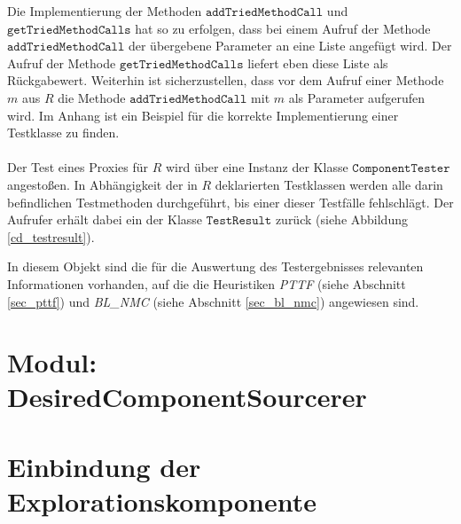 \noindent
Die Implementierung der Methoden $\texttt{addTriedMethodCall}$ und $\texttt{getTriedMethodCalls}$ hat so zu erfolgen, dass bei einem Aufruf der Methode $\texttt{addTriedMethodCall}$ der übergebene Parameter an eine Liste angefügt wird. Der Aufruf der Methode $\texttt{getTriedMethodCalls}$ liefert eben diese Liste als Rückgabewert. Weiterhin ist sicherzustellen, dass vor dem Aufruf einer Methode $m$ aus $R$ die Methode $\texttt{addTriedMethodCall}$ mit $m$ als Parameter aufgerufen wird. Im Anhang ist ein Beispiel für die korrekte Implementierung einer Testklasse zu finden.
\\\\
Der Test eines Proxies für $R$ wird über eine Instanz der Klasse $\texttt{ComponentTester}$ angestoßen. In Abhängigkeit der in $R$ deklarierten Testklassen werden alle darin befindlichen Testmethoden durchgeführt, bis einer dieser Testfälle fehlschlägt. Der Aufrufer erhält dabei ein der Klasse $\texttt{TestResult}$ zurück (siehe Abbildung \ref{cd_testresult}). 
\begin{figure}

\end{figure}\label{cd_testresult}
\noindent
In diesem Objekt sind die für die Auswertung des Testergebnisses relevanten Informationen vorhanden, auf die die Heuristiken \emph{PTTF} (siehe Abschnitt \ref{sec_pttf}) und \emph{BL\_NMC} (siehe Abschnitt \ref{sec_bl_nmc}) angewiesen sind.


\section{Modul: DesiredComponentSourcerer}

\section{Einbindung der Explorationskomponente}